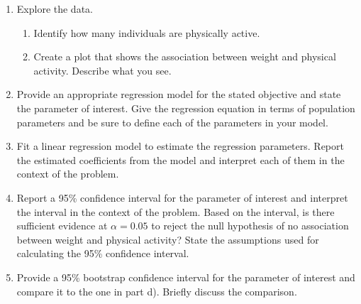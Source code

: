 \documentclass[letterpaper,12pt,twoside,]{pinp}
\begin{document}
\begin{enumerate}
\def\labelenumi{\alph{enumi})}
\item
  Explore the data.

  \begin{enumerate}
  \def\labelenumii{\roman{enumii}.}
  \item
    Identify how many individuals are physically active.
  \item
    Create a plot that shows the association between weight and physical
    activity. Describe what you see.
  \end{enumerate}
\item
  Provide an appropriate regression model for the stated objective and
  state the parameter of interest. Give the regression equation in terms
  of population parameters and be sure to define each of the parameters
  in your model.
\item
  Fit a linear regression model to estimate the regression parameters.
  Report the estimated coefficients from the model and interpret each of
  them in the context of the problem.
\item
  Report a 95\% confidence interval for the parameter of interest and
  interpret the interval in the context of the problem. Based on the
  interval, is there sufficient evidence at \(\alpha = 0.05\) to reject
  the null hypothesis of no association between weight and physical
  activity? State the assumptions used for calculating the 95\%
  confidence interval.
\item
  Provide a 95\% bootstrap confidence interval for the parameter of
  interest and compare it to the one in part d). Briefly discuss the
  comparison.
\end{enumerate}





\end{document}
